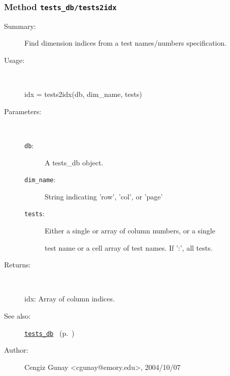 \subsubsection[Method \texttt{tests2idx}]{Method \texttt{tests\_db/tests2idx}}%
%
\label{ref_tests_db__tests2idx}%
\hypertarget{ref_tests_db__tests2idx}{}%
\begin{description}
\item[Summary:]Find dimension indices from a test names/numbers specification.
%
\item[Usage:]~%
\begin{lyxcode}%
idx = tests2idx(db, dim\_name, tests)
%
\end{lyxcode}%
%
%
\item[Parameters:]~
\begin{description}%
\item[\texttt{db}:]
 A tests\_db object.
\item[\texttt{dim\_name}:]
 String indicating 'row', 'col', or 'page'
\item[\texttt{tests}:]
 Either a single or array of column numbers, or a single

test name or a cell array of test names. If ':', all tests.\end{description}%
%
\item[Returns:]~

	idx: Array of column indices.
%
%
\item[See also:]%
\hyperlink{ref_tests_db}{\texttt{tests\_db}}%
\ (p.~\pageref{ref_tests_db})%
%
%
\item[Author:]%
Cengiz Gunay <cgunay@emory.edu>, 2004/10/07%
\end{description}
\methodline%
